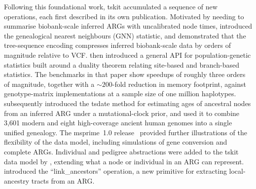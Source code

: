\documentclass{article}
\begin{document}
Following this foundational work, tskit
accumulated a sequence of new operations, each first described in its own
publication. Motivated by needing to summarise biobank-scale inferred ARGs
with uncalibrated node times, \citet{kelleher2019inferring} introduced
the genealogical nearest neighbours (GNN) statistic, and
demonstrated that the tree-sequence encoding compresses inferred
biobank-scale data by orders of magnitude relative to VCF.
\citet{ralph2020efficiently} then introduced a general API for
population-genetic statistics built around a duality theorem
relating site-based and branch-based statistics.
The benchmarks in that paper show
speedups of roughly three orders of magnitude, together with
a $\sim 200$-fold reduction in memory footprint, against
genotype-matrix implementations at a sample size of one million haplotypes.
\citet{wohns2022unified} subsequently introduced the tsdate method
for estimating ages of ancestral nodes from an inferred ARG under
a mutational-clock prior, and used it to combine 3{,}601 modern
and eight high-coverage ancient human genomes into a single
unified genealogy.
The msprime~1.0 release~\citep{baumdicker2022efficient} provided further
illustrations of the flexibility of the data model,
including simulations of gene conversion and complete ARGs.
Individual and pedigree abstractions were added to the tskit data
model by \citet{andersontrocme2023genes}, extending what a node or
individual in an ARG can represent.
\citet{tsambos2023link} introduced the ``link\_ancestors''
operation, a new primitive for extracting local-ancestry tracts
from an ARG.
\end{document}
